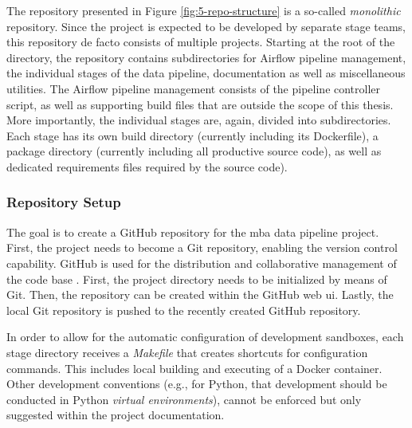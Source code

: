 The repository presented in Figure \ref{fig:5-repo-structure} is a so-called \textit{monolithic} repository. Since the project is expected to be developed by separate stage teams, this repository de facto consists of multiple projects. Starting at the root of the directory, the repository contains subdirectories for Airflow pipeline management, the individual stages of the data pipeline, documentation as well as miscellaneous utilities. The Airflow pipeline management consists of the pipeline controller script, as well as supporting build files that are outside the scope of this thesis. More importantly, the individual stages are, again, divided into subdirectories. Each stage has its own build directory (currently including its Dockerfile), a package directory (currently including all productive source code), as well as dedicated requirements files required by the source code).

\subsubsection{Repository Setup}
The goal is to create a GitHub repository for the \ac{mba} data pipeline project. First, the project needs to become a Git repository, enabling the version control capability. GitHub is used for the distribution and collaborative management of the code base \cite[25\psqq]{Chacon2020}\cite{github}. First, the project directory needs to be initialized by means of Git. Then, the repository can be created within the GitHub web \ac{ui}. Lastly, the local Git repository is pushed to the recently created GitHub repository.

In order to allow for the automatic configuration of development sandboxes, each stage directory receives a \textit{Makefile} that creates shortcuts for configuration commands. This includes local building and executing of a Docker container. Other development conventions (e.g., for Python, that development should be conducted in Python \textit{virtual environments}), cannot be enforced but only suggested within the project documentation.

